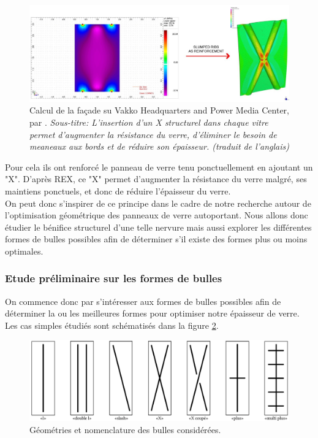 \documentclass[11pt,titlepage]{article}
\begin{document}
\begin{figure}[H]
    \centering
    \includegraphics[width=\linewidth]{img/bulle/stringio.jpg}
    \caption{Calcul de la façade su Vakko Headquarters and Power Media Center, par \Textcite{REX}. \textit{Sous-titre: L'insertion d'un X structurel dans chaque vitre permet d'augmenter la résistance du verre, d'éliminer le besoin de meaneaux aux bords et de réduire son épaisseur. (traduit de l'anglais)}}
    \label{fig:REXcalc}
\end{figure}

Pour cela ils ont renforcé le panneau de verre tenu ponctuellement en ajoutant un "X". D'après REX, ce "X" permet d'augmenter la résistance du verre malgré, ses maintiens ponctuels, et donc de réduire l'épaisseur du verre.
\\

On peut donc s'inspirer de ce principe dans le cadre de notre recherche autour de l'optimisation géométrique des panneaux de verre autoportant. Nous allons donc étudier le bénifice structurel d'une telle nervure mais aussi explorer les différentes formes de bulles possibles afin de déterminer s'il existe des formes plus ou moins optimales. 

\subsubsection{Etude préliminaire sur les formes de bulles}

On commence donc par s'intéresser aux formes de bulles possibles afin de déterminer la ou les meilleures formes pour optimiser notre épaisseur de verre. Les cas simples étudiés sont schématisés dans la figure \ref{fig:types_bulle}. 

\begin{figure}[H]
    \centering
    \includegraphics[width=\linewidth]{img/bulle/types_bulles.pdf}
    \caption{Géométries et nomenclature des bulles considérées.}
    \label{fig:types_bulle}
\end{figure}
\end{document}
